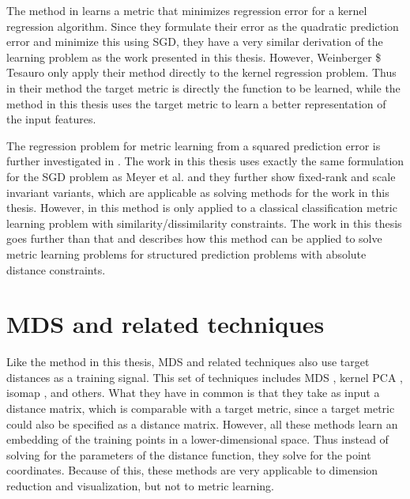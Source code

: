 The method in \cite{weinberger2007metric} learns a metric that minimizes regression error for a kernel regression algorithm. Since they formulate their error as the quadratic prediction error and minimize this using \ac{SGD}, they have a very similar derivation of the learning problem as the work presented in this thesis. However, Weinberger \$ Tesauro only apply their method directly to the kernel regression problem. Thus in their method the target metric is directly the function to be learned, while the method in this thesis uses the target metric to learn a better representation of the input features. 

The regression problem for metric learning from a squared prediction error is further investigated in \cite{meyer2011regression}. The work in this thesis uses exactly the same formulation for the \ac{SGD} problem as Meyer et al. and they further show fixed-rank and scale invariant variants, which are applicable as solving methods for the work in this thesis. However, in \cite{meyer2011regression} this method is only applied to a classical classification metric learning problem with similarity/dissimilarity constraints. The work in this thesis goes further than that and describes how this method can be applied to solve metric learning problems for structured prediction problems with absolute distance constraints.


\section{MDS and related techniques}

Like the method in this thesis, \acf{MDS} and related techniques also use target distances as a training signal. This set of techniques includes \ac{MDS} \cite{venna2006local, chen2009local, chen2013stress}, kernel PCA \cite{scholkopf1997kernel}, isomap \cite{tenenbaum2000global}, and others. What they have in common is that they take as input a distance matrix, which is comparable with a target metric, since a target metric could also be specified as a distance matrix. However, all these methods learn an embedding of the training points in a lower-dimensional space. Thus instead of solving for the parameters of the distance function, they solve for the point coordinates. Because of this, these methods are very applicable to dimension reduction and visualization, but not to metric learning.


